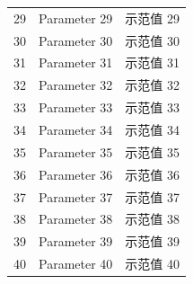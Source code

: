 \begin{longtable}{cll}
29 & Parameter 29 & 示范值 29 \\
30 & Parameter 30 & 示范值 30 \\
31 & Parameter 31 & 示范值 31 \\
32 & Parameter 32 & 示范值 32 \\
33 & Parameter 33 & 示范值 33 \\
34 & Parameter 34 & 示范值 34 \\
35 & Parameter 35 & 示范值 35 \\
36 & Parameter 36 & 示范值 36 \\
37 & Parameter 37 & 示范值 37 \\
38 & Parameter 38 & 示范值 38 \\
39 & Parameter 39 & 示范值 39 \\
40 & Parameter 40 & 示范值 40 \\
\end{longtable}
